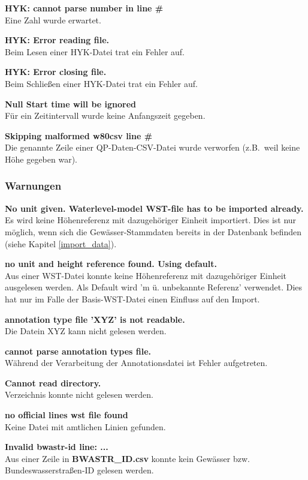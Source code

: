 \textbf{HYK: cannot parse number in line \#}
\\Eine Zahl wurde erwartet.

\textbf{HYK: Error reading file.}
\\Beim Lesen einer HYK-Datei trat ein Fehler auf.

\textbf{HYK: Error closing file.}
\\Beim Schließen einer HYK-Datei trat ein Fehler auf.

\textbf{Null Start time will be ignored}
\\Für ein Zeitintervall wurde keine Anfangszeit gegeben.

\textbf{Skipping malformed w80csv line \#}
\\Die genannte Zeile einer QP-Daten-CSV-Datei wurde verworfen
(z.B.\ weil keine Höhe gegeben war).

\subsubsection{Warnungen}
\textbf{No unit given. Waterlevel-model WST-file has to be imported already.}
\\Es wird keine Höhenreferenz mit dazugehöriger Einheit importiert.
Dies ist nur möglich, wenn sich die Gewässer-Stammdaten bereits
in der Datenbank befinden (siehe Kapitel \ref{import_data}).

\textbf{no unit and height reference found. Using default.}
\\Aus einer WST-Datei konnte keine Höhenreferenz
mit dazugehöriger Einheit ausgelesen werden.
Als Default wird 'm ü. unbekannte Referenz' verwendet.
Dies hat nur im Falle der Basis-WST-Datei einen Einfluss auf den Import.

\textbf{annotation type file 'XYZ' is not readable.}
\\Die Datein XYZ kann nicht gelesen werden.

\textbf{cannot parse annotation types file.}
\\Während der Verarbeitung der Annotationsdatei ist Fehler aufgetreten.

\textbf{Cannot read directory.}
\\Verzeichnis konnte nicht gelesen werden.

\textbf{no official lines wst file found}
\\Keine Datei mit amtlichen Linien gefunden.

\textbf{Invalid bwastr-id line: ...}
\\Aus einer Zeile in \textbf{BWASTR\_ID.csv} konnte kein Gewässer bzw.
Bundeswasserstraßen-ID gelesen werden.

